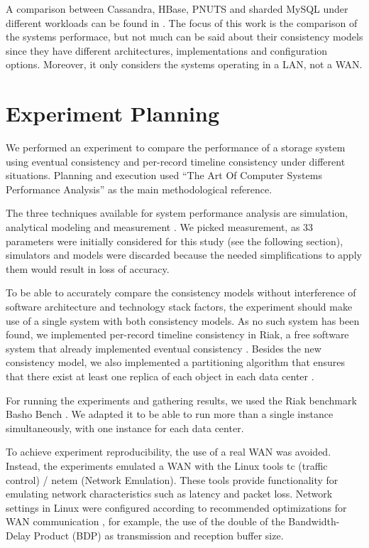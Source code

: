 \documentclass[doublespacing]{bmcart}
\begin{document}
A comparison between Cassandra, HBase, PNUTS and sharded MySQL under different
workloads can be found in \cite{Cooper2010}. The focus of this work is the
comparison of the systems performace, but not much can be said about their
consistency models since they have different architectures, implementations and
configuration options. Moreover, it only considers the systems operating in a
LAN, not a WAN.

\section{Experiment Planning}

We performed an experiment to compare the performance of a storage system using
eventual consistency and per-record timeline consistency under different
situations. Planning and execution used ``The Art Of Computer Systems
Performance Analysis'' \cite{Jain1991} as the main methodological reference.

The three techniques available for system performance analysis are simulation,
analytical modeling and measurement \cite{Jain1991}. We picked measurement, as
33 parameters were initially considered for this study (see the following
section), simulators and models were discarded because the needed
simplifications to apply them would result in loss of accuracy.

To be able to accurately compare the consistency models without interference of
software architecture and technology stack factors, the experiment should make
use of a single system with both consistency models. As no such system has been
found, we implemented per-record timeline consistency in Riak, a free software
system that already implemented eventual consistency \cite{Riak2013}. Besides
the new consistency model, we also implemented a partitioning algorithm that
ensures that there exist at least one replica of each object in each data
center \cite{DeDiana2013a, DeDiana2013b}.

For running the experiments and gathering results, we used the Riak benchmark
Basho Bench \cite{BashoBench2013}. We adapted it to be able to run more than a
single instance simultaneously, with one instance for each data center.

To achieve experiment reproducibility, the use of a real WAN was avoided.
Instead, the experiments emulated a WAN with the Linux tools tc (traffic
control) / netem (Network Emulation). These tools provide functionality for
emulating network characteristics such as latency and packet loss. Network
settings in Linux were configured according to recommended optimizations for
WAN communication \cite{ESnet2012}, for example, the use of the double of the
Bandwidth-Delay Product (BDP) as transmission and reception buffer size.
\end{document}
